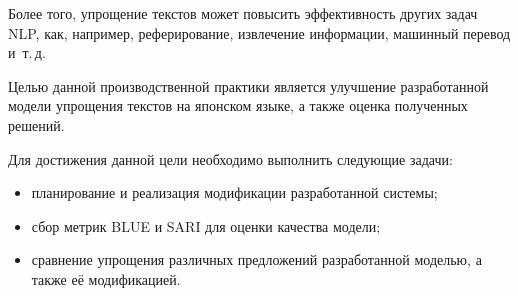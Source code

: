 Более того, упрощение текстов может повысить эффективность других задач NLP, как, например, реферирование, извлечение информации, машинный перевод и~т.\,д.

Целью данной производственной практики является улучшение разработанной модели упрощения текстов на японском языке, а также оценка полученных решений.

Для достижения данной цели необходимо выполнить следующие задачи:
\begin{itemize}%
  \item планирование и реализация модификации разработанной системы;
  \item сбор метрик BLUE и SARI для оценки качества модели;
  \item сравнение упрощения различных предложений разработанной моделью, а также её модификацией.
\end{itemize}


